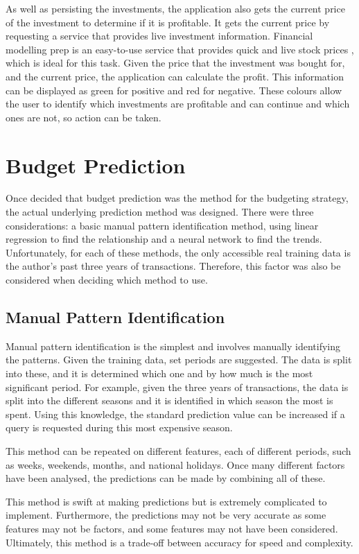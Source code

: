 As well as persisting the investments, the application also gets the current price of the investment to determine if it is profitable. It gets the current price by requesting a service that provides live investment information. Financial modelling prep is an easy-to-use service that provides quick and live stock prices \cite{FMP}, which is ideal for this task. Given the price that the investment was bought for, and the current price, the application can calculate the profit. This information can be displayed as green for positive and red for negative. These colours allow the user to identify which investments are profitable and can continue and which ones are not, so action can be taken.

\section{Budget Prediction}
\label{sec:BudgetPrediction}
Once decided that budget prediction was the method for the budgeting strategy, the actual underlying prediction method was designed. There were three considerations: a basic manual pattern identification method, using linear regression to find the relationship and a neural network to find the trends. Unfortunately, for each of these methods, the only accessible real training data is the author's past three years of transactions. Therefore, this factor was also be considered when deciding which method to use.

\subsection{Manual Pattern Identification}
Manual pattern identification is the simplest and involves manually identifying the patterns. Given the training data, set periods are suggested. The data is split into these, and it is determined which one and by how much is the most significant period. For example, given the three years of transactions, the data is split into the different seasons and it is identified in which season the most is spent. Using this knowledge, the standard prediction value can be increased if a query is requested during this most expensive season.

This method can be repeated on different features, each of different periods, such as weeks, weekends, months, and national holidays. Once many different factors have been analysed, the predictions can be made by combining all of these.

This method is swift at making predictions but is extremely complicated to implement. Furthermore, the predictions may not be very accurate as some features may not be factors, and some features may not have been considered. Ultimately, this method is a trade-off between accuracy for speed and complexity.

